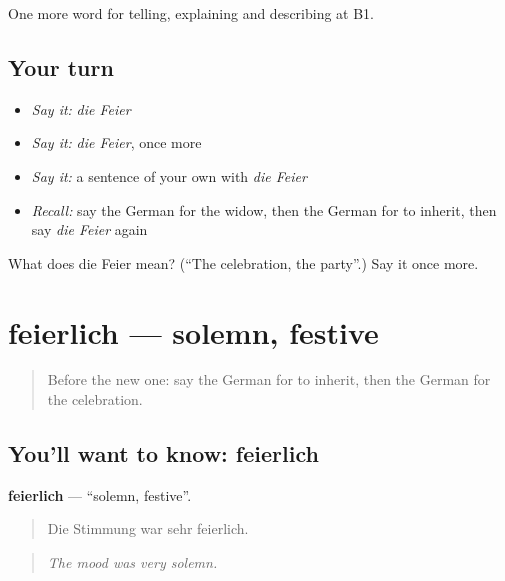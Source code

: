 \begin{grammarlens}[title={What you've built}]
One more word for telling, explaining and describing at B1.
\end{grammarlens}

\subsection*{Your turn}
\begin{itemize}
\raggedright
  \item \emph{Say it:} \emph{die Feier}
  \item \emph{Say it:} \emph{die Feier}, once more
  \item \emph{Say it:} a sentence of your own with \emph{die Feier}
  \item \emph{Recall:} say the German for the widow, then the German for to inherit, then say \emph{die Feier} again
\end{itemize}

\begin{tcolorbox}[breakable,colback=teal!4,colframe=teal!35!black,title={Before you move on}]
What does die Feier mean? (\textquotedblleft{}The celebration, the party\textquotedblright{}.) Say it once more.
\end{tcolorbox}
\section[feierlich]{feierlich — solemn, festive}

\label{lesson:GE-C305-feierlich}



\begin{quote}
Before the new one: say the German for to inherit, then the German for the celebration.
\end{quote}

\subsection*{You'll want to know: feierlich}
\textbf{feierlich} — \textquotedblleft{}solemn, festive\textquotedblright{}.

\begin{quote}
Die Stimmung war sehr feierlich.
\end{quote}

\begin{quote}
\emph{The mood was very solemn.}
\end{quote}

